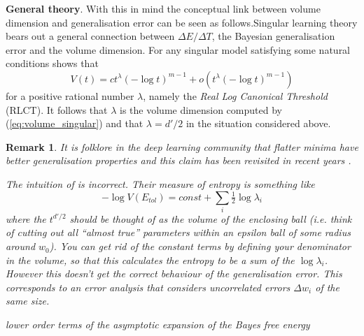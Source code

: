 \documentclass{article} %
\newtheorem{remark}[theorem]{Remark}
\begin{document}
\textbf{General theory}. With this in mind the conceptual link between volume dimension and generalisation error can be seen as follows.Singular learning theory bears out a general connection between $\Delta E / \Delta T$, the Bayesian generalisation error and the volume dimension. For any singular model satisfying some natural conditions \citep[Theorem 7.1]{watanabe_algebraic_2009} shows that
\[
V(t) = c t^\lambda (- \log t)^{m-1} + o( t^\lambda ( - \log t)^{m-1})
\]
for a positive rational number $\lambda$, namely the \emph{Real Log Canonical Threshold} (RLCT). It follows that $\lambda$ is the volume dimension computed by (\ref{eq:volume_singular}) and that $\lambda = d'/2$ in the situation considered above. 

\begin{remark}
It is folklore in the deep learning community that flatter minima have better generalisation properties \citep{hinton_keeping_1993, hochreiter1997flat} and this claim has been revisited in recent years \citep{chaudhari2019entropy, smith2017bayesian, jastrzkebski2017three, Zhang:2018MolPh.116.3214Z}. 

The intuition of \citep{hochreiter1997flat} is incorrect. Their measure of entropy is something like
\[
- \log V(E_{tol}) = const + \sum_i \tfrac{1}{2} \log \lambda_i
\]
where the $t^{d'/2}$ should be thought of as the volume of the enclosing ball (i.e. think of cutting out all ``almost true'' parameters within an epsilon ball of some radius around $w_0$). You can get rid of the constant terms by defining your denominator in the volume, so that this calculates the entropy to be a sum of the $\log \lambda_i$. However this doesn't get the correct behaviour of the generalisation error. This corresponds to an error analysis that considers uncorrelated errors $\Delta w_i$ of the same size.

 lower order terms of the asymptotic expansion of the Bayes free energy \citep[\S 3.1]{Balasubramanian:1996cond.mat..1030B}
\end{remark}

\end{document}
